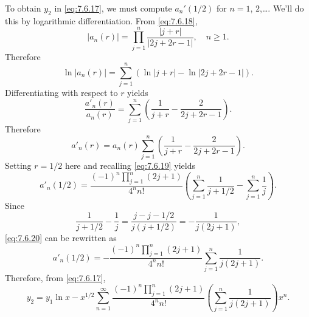 \begin{examplesolution}
To obtain $y_{2}$ in \eqref{eq:7.6.17}, we must compute $a_{n}'(1/2)$ for $n=1$, $2$,\dots. We'll do
this by logarithmic differentiation. From \eqref{eq:7.6.18},
\[
  |a_{n}(r)|=\prod_{j=1}^{n}\frac{|j+r|}{|2j+2r-1|},\quad n\ge1.
\]
Therefore
\[
  \ln|a_{n}(r)|=\sum^{n}_{j=1}\left(\ln|j+r|-\ln|2j+2r-1|\right).
\]
Differentiating with respect to $r$ yields
\[
  \frac{a'_{n}(r)}{a_{n}(r)}=\sum^{n}_{j=1}\left(\frac{1}{j+r}-\frac{2}{2j+2r-1}\right).
\]
Therefore
\[
  a'_{n}(r)=a_{n}(r)\sum^{n}_{j=1}\left(\frac{1}{j+r}-\frac{2}{2j+2r-1}\right).
\]
Setting $r=1/2$ here and recalling \eqref{eq:7.6.19} yields
\begin{equation}
  \label{eq:7.6.20}a'_{n}(1/2)=\frac{(-1)^{n}\prod_{j=1}^{n}(2j+1)}{4^{n}n!}\left(\sum_{j=1}^{n}\frac{1}{j+1/2}-\sum_{j=1}^{n}\frac{1}{j}\right).
\end{equation}
Since
\[
  \frac{1}{j+1/2}-\frac{1}{j}=\frac{j-j-1/2}{j(j+1/2)}=-\frac{1}{j(2j+1)},
\]
\eqref{eq:7.6.20} can be rewritten as
\[
  a'_{n}(1/2)=-\frac{(-1)^{n}\prod_{j=1}^{n}(2j+1)}{4^{n}n!}\sum_{j=1}^{n}\frac{1}{j(2j+1)}.
\]
Therefore, from \eqref{eq:7.6.17},
\[
  y_{2}=y_{1}\ln x-x^{1/2}\sum_{n=1}^{\infty}\frac{(-1)^{n}\prod_{j=1}^{n}(2j+1)}{4^{n}n!}\left(\sum_{j=1}^{n}\frac{1}{j(2j+1)}\right)x^{n}.
\]
\end{examplesolution}


